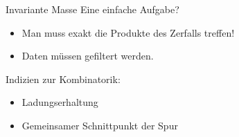  \begin{frame}{Invariante Masse}
     Eine einfache Aufgabe?\\ \vspace{0.5cm} \pause
     \begin{itemize}
         \item [\ding{43}] Man muss exakt die Produkte des Zerfalls treffen! \\ 
         \item  [\ding{43}] Daten müssen gefiltert werden. 
               \end{itemize}\vspace{0.5cm} \pause
           Indizien zur Kombinatorik: 
           
          \begin{itemize}
         \item [\ding{202}]Ladungserhaltung
         \item [\ding{203}]Gemeinsamer Schnittpunkt der Spur
                    \end{itemize}
\end{frame}
